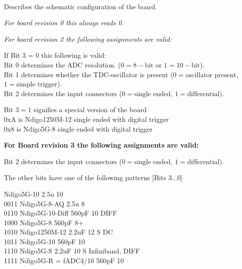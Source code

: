             \\
            Describes the schematic configuration of the board.\par

            \noindent\textit{For board revision 0 this always reads 0.}\par

            \noindent\textit{For board revision 2 the following assignments are valid:}\par

            \noindent If Bit 3 = 0 this following is valid:\\
            Bit 0 determines the ADC resolution. ($0 = 8-\text{bit}$ or $1 = 10-\text{bit}$).\\
            Bit 1 determines whether the TDC-oscillator is present ($0 = \text{oscillator present}$, $1 = \text{simple trigger}$).\\
            Bit 2 determines the input connectors ($0 = \text{single ended}$, $1 = \text{differential}$).\par

            \noindent Bit $3 = 1$ signifies a special version of the board\\
            0xA is Ndigo1250M-12 single ended with digital trigger\\
            0x8 is Ndigo5G-8 single ended with digital trigger\par

            \noindent\textbf{For Board revision 3 the following assignments are valid:}\par

            \noindent Bit 2 determines the input connectors ($0 = \text{single ended}$, $1 = \text{differential}$).\par

            \noindent The other bits have one of the following patterns [Bits 3...0]\par

             Ndigo5G-10 2.5u 10\\
            0011 Ndigo5G-8-AQ 2.5u 8\\
            0110 Ndigo5G-10-Diff 560pF 10 DIFF\\
            1000 Ndigo5G-8 560pF 8+\\
            1010 Ndigo1250M-12 2.2uF 12 S DC\\
            1011 Ndigo5G-10 560pF 10\\
            1110 Ndigo5G-S 2.2uF 10 S Infiniband, DIFF\\
            1111 Ndigo5G-R = fADC4/10 560pF 10\par

